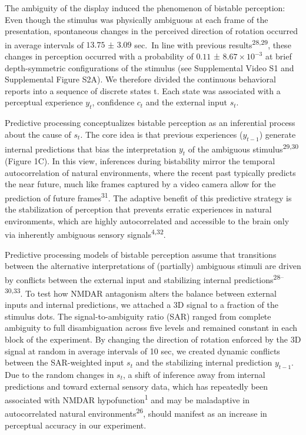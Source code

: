 \documentclass[
]{article}
\begin{document}
The ambiguity of the display induced the phenomenon of bistable
perception: Even though the stimulus was physically ambiguous at each
frame of the presentation, spontaneous changes in the perceived
direction of rotation occurred in average intervals of \(13.75\) ±
\(3.09\) sec.~In line with previous results\textsuperscript{28,29},
these changes in perception occurred with a probability of \(0.11\) ±
\(\ensuremath{8.67\times 10^{-3}}\) at brief depth-symmetric
configurations of the stimulus (see Supplemental Video S1 and
Supplemental Figure S2A). We therefore divided the continuous behavioral
reports into a sequence of discrete states t. Each state was associated
with a perceptual experience \(y_t\), confidence \(c_t\) and the
external input \(s_t\).

Predictive processing conceptualizes bistable perception as an
inferential process about the cause of \(s_t\). The core idea is that
previous experiences (\(y_{t-1}\)) generate internal predictions that
bias the interpretation \(y_t\) of the ambiguous
stimulus\textsuperscript{29,30} (Figure 1C). In this view, inferences
during bistability mirror the temporal autocorrelation of natural
environments, where the recent past typically predicts the near future,
much like frames captured by a video camera allow for the prediction of
future frames\textsuperscript{31}. The adaptive benefit of this
predictive strategy is the stabilization of perception that prevents
erratic experiences in natural environments, which are highly
autocorrelated and accessible to the brain only via inherently ambiguous
sensory signals\textsuperscript{4,32}.

Predictive processing models of bistable perception assume that
transitions between the alternative interpretations of (partially)
ambiguous stimuli are driven by conflicts between the external input and
stabilizing internal predictions\textsuperscript{28--30,33}. To test how
NMDAR antagonism alters the balance between external inputs and internal
predictions, we attached a 3D signal to a fraction of the stimulus dots.
The signal-to-ambiguity ratio (SAR) ranged from complete ambiguity to
full disambiguation across five levels and remained constant in each
block of the experiment. By changing the direction of rotation enforced
by the 3D signal at random in average intervals of 10 sec, we created
dynamic conflicts between the SAR-weighted input \(s_t\) and the
stabilizing internal prediction \(y_{t-1}\). Due to the random changes
in \(s_t\), a shift of inference away from internal predictions and
toward external sensory data, which has repeatedly been associated with
NMDAR hypofunction\textsuperscript{1} and may be maladaptive in
autocorrelated natural environments\textsuperscript{26}, should manifest
as an increase in perceptual accuracy in our experiment.
\end{document}

